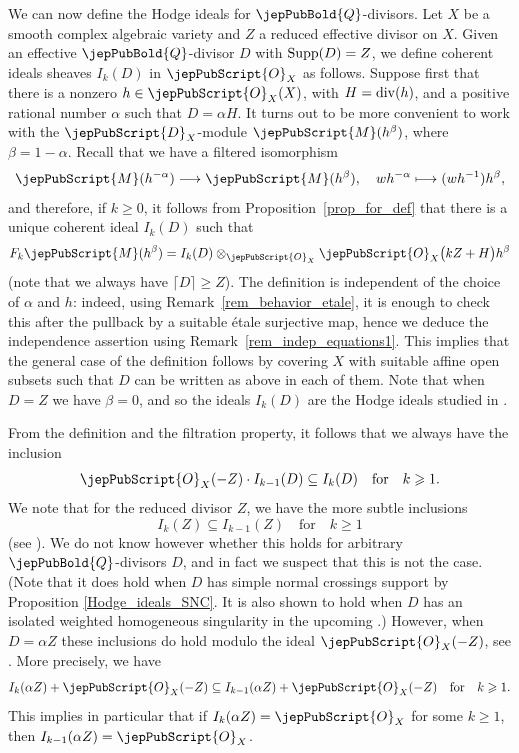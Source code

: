 We can now  define the Hodge ideals for $\jepPubBold{Q}$-divisors. Let $X$ be a smooth complex algebraic variety and $Z$ a reduced effective divisor on $X$.
Given an effective $\jepPubBold{Q}$-divisor $D$ with ${\rm Supp}(D)=Z$, we define coherent ideals sheaves $I_k(D)$  in $\jepPubScript{O}_X$ as follows.
Suppose first that there is a nonzero $h\in\jepPubScript{O}_X(X)$, with $H = {\rm div}(h)$, and a positive rational number $\alpha$ such that $D=\alpha H$. 
It turns out to be more convenient to work with the $\jepPubScript{D}_X$-module $\jepPubScript{M} (h^\beta)$, where $\beta = 1 - \alpha$. Recall that we have a 
filtered isomorphism 
$$\jepPubScript{M} (h^{-\alpha}) \longrightarrow \jepPubScript{M} (h^\beta), \,\,\,\,\,\,wh^{- \alpha} \longmapsto (wh^{-1})h^\beta,$$
and therefore, if $k\geqslant 0$,
it follows from Proposition~\ref{prop_for_def} that there is a unique coherent ideal $I_k(D)$ such that 
$$F_k\jepPubScript{M}(h^{\beta})=I_k(D)\otimes_{\jepPubScript{O}_X} \jepPubScript{O}_X\big(kZ + H \big)h^{\beta}$$
(note that we always have $\lceil D \rceil \geqslant Z$).
The definition is independent of the choice of $\alpha$ and $h$: indeed, using Remark~\ref{rem_behavior_etale}, it is enough to check this after the pullback by a suitable \'{e}tale surjective map, hence we deduce the independence assertion using Remark~\ref{rem_indep_equations1}. 
This implies that the general case of the definition follows by covering $X$ with suitable affine open subsets such that $D$ can be written as above in each of them. Note that when $D=Z$ we have $\beta = 0$, and so the ideals $I_k(D)$ are the Hodge ideals studied in \cite{MP1}.

\begin{remark}\label{rmk_inclusion_ideals}
From the definition and the filtration property,  it follows that we always have the inclusion 
$$\jepPubScript{O}_X (-Z) \cdot I_{k-1}(D) \subseteq I_k (D)\quad\text{for}\quad k\geqslant 1.$$ 
We note that for the reduced divisor $Z$,
we have the more subtle inclusions
$$I_k (Z) \subseteq I_{k-1} (Z)\quad \text{for}\quad k\geqslant 1$$
(see \cite[Prop.~13.1]{MP1}). We do not know however whether this holds for arbitrary $\jepPubBold{Q}$-divisors $D$, 
and in fact we suspect that this is not the case. (Note that it does hold when $D$ has simple normal crossings support
by Proposition \ref{Hodge_ideals_SNC}. It is also shown to hold when $D$ has an isolated weighted homogeneous singularity 
in the upcoming \cite{Zhang}.)
However, when $D = \alpha Z$ these inclusions do hold modulo the ideal $\jepPubScript{O}_X(-Z)$, see \cite[Cor.~B]{MP3}. 
More precisely, we have 
$$I_k(\alpha Z)+\jepPubScript{O}_X(-Z)\subseteq I_{k-1}(\alpha Z)+\jepPubScript{O}_X(-Z)\quad\text{for}\quad k\geqslant 1.$$
This implies in particular that if $I_k(\alpha Z)=\jepPubScript{O}_X$ for some $k\geqslant 1$, then $I_{k-1}(\alpha Z)=\jepPubScript{O}_X$.
\end{remark}

